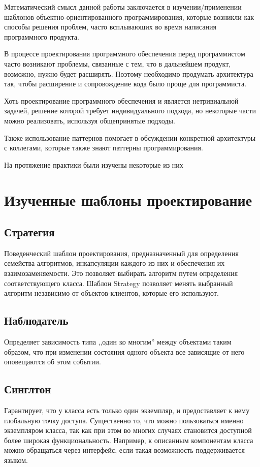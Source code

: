 \documentclass[a4paper,12pt,notitlepage,pdftex,headsepline]{scrreprt}
\begin{document}
Математический смысл данной работы заключается в изучении/применении шаблонов
объектно-ориентированного программирования, которые возникли как способы
решения проблем, часто всплывающих во время написания программного продукта.

В процессе проектирования программного обеспечения перед программистом часто
возникают проблемы, связанные с тем, что в дальнейшем продукт, возможно, нужно
будет расширять.
Поэтому необходимо продумать архитектура так, чтобы расширение и сопровождение
кода было проще для программиста.

Хоть проектирование программного обеспечения и является нетривиальной задачей,
решение которой требует индивидуального подхода, но некоторые части можно
реализовать, используя общепринятые подходы.

Также использование паттернов помогает в обсуждении конкретной архитектуры с
коллегами, которые также знают паттерны программирования.

На протяжение практики были изучены некоторые из них

\section{Изученные шаблоны проектирование}
\subsection{Стратегия}
Поведенческий шаблон проектирования, предназначенный для определения семейства
алгоритмов, инкапсуляции каждого из них и обеспечения их взаимозаменяемости.
Это позволяет выбирать алгоритм путем определения соответствующего класса.
Шаблон Strategy позволяет менять выбранный алгоритм независимо от
объектов-клиентов, которые его используют.
\subsection{Наблюдатель}
Определяет зависимость типа ,,один ко многим'' между объектами таким образом,
что при изменении состояния одного объекта все зависящие от него оповещаются
об этом событии.
\subsection{Синглтон}
Гарантирует, что у класса есть только один экземпляр, и предоставляет к нему
глобальную точку доступа.
Существенно то, что можно пользоваться именно экземпляром класса, так как при
этом во многих случаях становится доступной более широкая функциональность.
Например, к описанным компонентам класса можно обращаться через интерфейс,
если такая возможность поддерживается языком.
\end{document}
